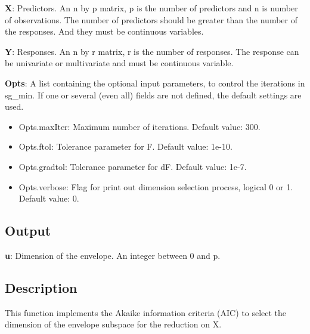 \documentclass[a4paper,11pt,openany]{memoir}
\begin{document}
\begin{par}
\textbf{X}: Predictors. An n by p matrix, p is the number of predictors and n is number of observations. The number of predictors should be greater than the number of the responses. And they must be continuous variables.
\end{par} \vspace{1em}
\begin{par}
\textbf{Y}: Responses. An n by r matrix, r is the number of responses. The response can be univariate or multivariate and must be continuous variable.
\end{par} \vspace{1em}
\begin{par}
\textbf{Opts}: A list containing the optional input parameters, to control the iterations in sg\_min. If one or several (even all) fields are not defined, the default settings are used.
\end{par} \vspace{1em}
\begin{itemize}
\setlength{\itemsep}{-1ex}
   \item Opts.maxIter: Maximum number of iterations.  Default value: 300.
   \item Opts.ftol: Tolerance parameter for F.  Default value: 1e-10.
   \item Opts.gradtol: Tolerance parameter for dF.  Default value: 1e-7.
   \item Opts.verbose: Flag for print out dimension selection process, logical 0 or 1. Default value: 0.
\end{itemize}


\subsection*{Output}

\begin{par}
\textbf{u}: Dimension of the envelope. An integer between 0 and p.
\end{par} \vspace{1em}


\subsection*{Description}

\begin{par}
This function implements the Akaike information criteria (AIC) to select the dimension of the envelope subspace for the reduction on X.
\end{par} \vspace{1em}
\end{document}
